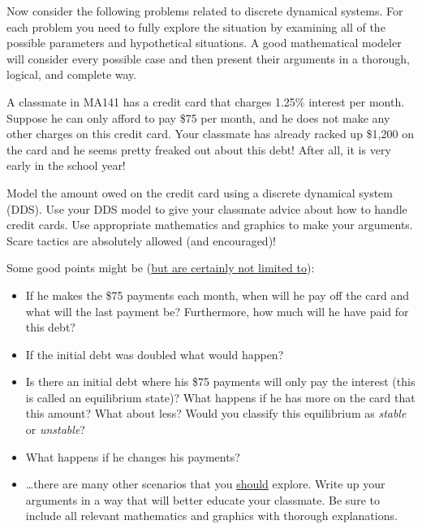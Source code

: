 Now consider the following problems related to discrete dynamical systems.  For each
problem you need to fully explore the situation by examining all of the possible
parameters and hypothetical situations.  A good mathematical modeler will consider every
possible case and then present their arguments in a thorough, logical, and complete way.
\begin{lab}
A classmate in MA141 has a credit card that charges 1.25\% interest per month. Suppose
    he can only afford to pay \$75 per month, and he does not make any other charges
    on this credit card. Your classmate has already racked up \$1,200 on the card and
    he seems pretty freaked out about this debt!  After all, it is very early in the
    school year!  

    Model the amount owed on the credit card using a discrete dynamical system (DDS).
    Use your DDS model to give your classmate advice about how to handle credit cards.  
    Use appropriate mathematics and graphics to make your arguments.  Scare tactics
    are absolutely allowed (and encouraged)!

    Some good points might be (\underline{but are certainly not limited to}):
    \begin{itemize}
        \item If he makes the \$75 payments each month, when will he pay off the card
            and what will the last payment be?  Furthermore, how much will he have
            paid for this debt?
        \item If the initial debt was doubled what would happen?
        \item Is there an initial debt where his \$75 payments will only pay the
            interest (this is called an equilibrium state)?  What happens
            if he has more on the card that this amount? What about less?  Would you
            classify this equilibrium as {\it stable} or {\it unstable}?
        \item What happens if he changes his payments?
        \item \dots there are many other scenarios that you \underline{should}
            explore.  Write up your arguments in a way that will better educate your
            classmate. Be sure to include all relevant mathematics and graphics with
            thorough explanations.
    \end{itemize}
\end{lab}

